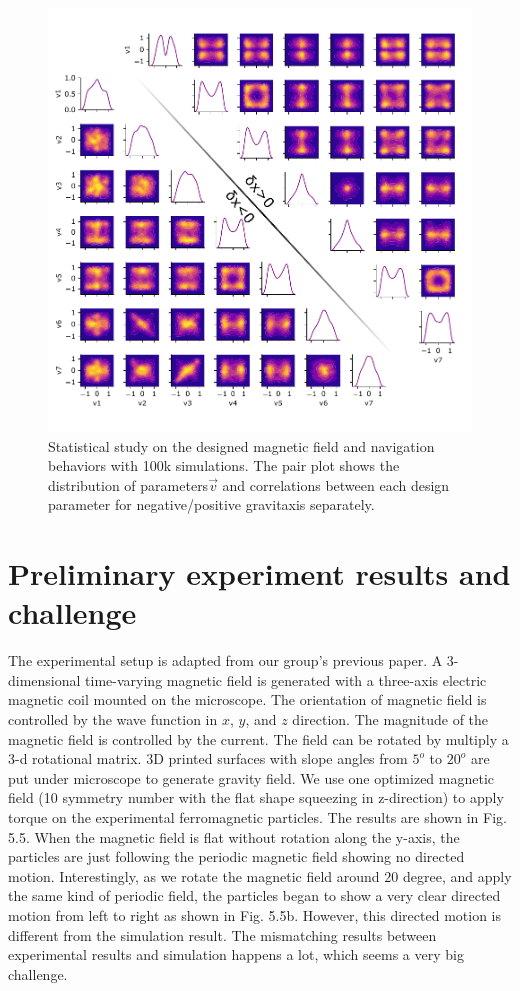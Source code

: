  
 \begin{figure}[p]
\centering
\includegraphics[width=16cm]{figures/5_4.pdf}
\caption{ Statistical study on the designed magnetic field and navigation behaviors with 100k simulations. The pair plot shows the distribution of parameters$\vec{v}$ and correlations between each design parameter for negative/positive gravitaxis separately.}
\label{fig:1}
\end{figure}
 
 
 
 \section{Preliminary experiment results and challenge}
 The experimental setup is adapted from our group's previous paper\autocite{fei2018magneto, fei2019magneto}. A 3-dimensional time-varying magnetic field is generated with a three-axis electric magnetic coil mounted on the microscope. The orientation of magnetic field is controlled by the wave function in $x$, $y$, and $z$ direction. The magnitude of the magnetic field is controlled by the current. The field can be rotated by multiply a 3-d rotational matrix. 3D printed  surfaces with slope angles from $5^o$ to  $20^o$ are put under microscope to generate gravity field. We use one optimized magnetic field (10 symmetry number with the flat shape  squeezing in z-direction) to apply torque on the experimental ferromagnetic particles. The results are shown in Fig. 5.5. When the magnetic field is flat without rotation along the y-axis, the particles are just following the periodic magnetic field showing no directed motion. Interestingly, as we rotate the magnetic field around $20$ degree, and apply the same kind of periodic field, the particles began to show a very clear directed motion from left to right as shown in Fig. 5.5b. However, this directed motion is different from the simulation result. The mismatching results between experimental results and simulation happens a lot, which seems a very big challenge. 
 
